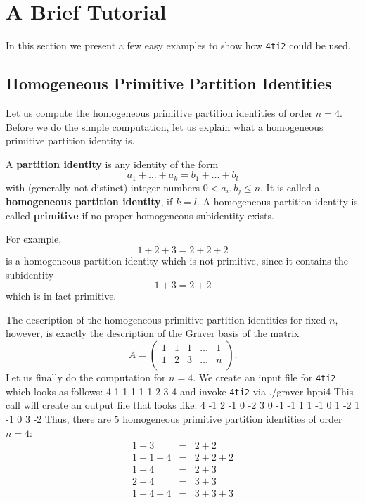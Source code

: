 \documentclass[12pt]{article}
\newenvironment{myverbatim}%
  {\quote\verbatim}%
  {\endverbatim\endquote}
\newcommand\File{\begingroup \urlstyle{sf}\Url}
\theoremstyle{definition}
\newcommand{\important}{\textbf}
\newcommand{\FourTiTwo}{{\tt 4ti2}}
\begin{document}

\section{A Brief Tutorial}
In this section we present a few easy examples to show how 
\FourTiTwo{} could be used.

\subsection{Homogeneous Primitive Partition Identities}
Let us compute the homogeneous primitive partition identities of order
$n=4$. Before we do the simple computation, let us explain what a
homogeneous primitive partition identity is.

A \important{partition identity} is any identity of the form
\[
a_1+\ldots+a_k=b_1+\ldots+b_l
\]
with (generally not distinct) integer numbers $0<a_i,b_j\leq n$. It is
called a \important{homogeneous partition identity}, if $k=l$. A homogeneous
partition identity is called \important{primitive} if no proper homogeneous
subidentity exists.

For example, 
\[
1+2+3=2+2+2
\]
is a homogeneous partition identity which is not primitive, since it
contains the subidentity
\[
1+3=2+2
\]
which is in fact primitive.

The description of the homogeneous primitive partition identities for
fixed $n$, however, is exactly the description of the Graver basis of
the matrix 
\[
A=
\left(
\begin{array}{ccccc}
 1 & 1 & 1 & \ldots & 1 \\ 
 1 & 2 & 3 & \ldots & n \\ 
\end{array}
\right).
\]
Let us finally do the computation for $n=4$. We create an input file
\File{hppi4} for \FourTiTwo{} which looks as follows: 
\begin{myverbatim}
2 4
1 1 1 1
1 2 3 4
\end{myverbatim}
and invoke \FourTiTwo{} via
\begin{myverbatim}
./graver hppi4
\end{myverbatim}
This call will create an output file \File{hppi4.gra} that looks
like:
\begin{myverbatim}
5 4
-1 2 -1  0
-2 3  0 -1
-1 1  1 -1
 0 1 -2  1
-1 0  3 -2
\end{myverbatim}
Thus, there are $5$ homogeneous primitive partition identities of
order $n=4$:
\begin{eqnarray*}
1+3   & = & 2+2\\
1+1+4 & = & 2+2+2\\
1+4   & = & 2+3\\
2+4   & = & 3+3\\
1+4+4 & = & 3+3+3
\end{eqnarray*}
\end{document}

